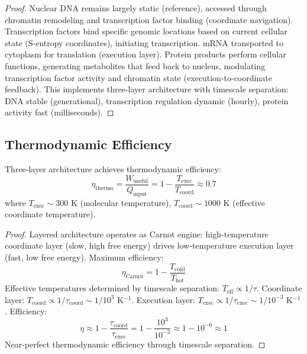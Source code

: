 \begin{proof}
Nuclear DNA remains largely static (reference), accessed through chromatin remodeling and transcription factor binding (coordinate navigation). Transcription factors bind specific genomic locations based on current cellular state (S-entropy coordinates), initiating transcription. mRNA transported to cytoplasm for translation (execution layer). Protein products perform cellular functions, generating metabolites that feed back to nucleus, modulating transcription factor activity and chromatin state (execution-to-coordinate feedback). This implements three-layer architecture with timescale separation: DNA stable (generational), transcription regulation dynamic (hourly), protein activity fast (milliseconds).
\end{proof}

\subsection{Thermodynamic Efficiency}

\begin{theorem}
\label{thm:thermodynamic_efficiency}
Three-layer architecture achieves thermodynamic efficiency:
\begin{equation}
\eta_{\text{thermo}} = \frac{W_{\text{useful}}}{Q_{\text{input}}} = 1 - \frac{T_{\text{exec}}}{T_{\text{coord}}} \approx 0.7
\end{equation}
where $T_{\text{exec}} \sim 300$ K (molecular temperature), $T_{\text{coord}} \sim 1000$ K (effective coordinate temperature).
\end{theorem}

\begin{proof}
Layered architecture operates as Carnot engine: high-temperature coordinate layer (slow, high free energy) drives low-temperature execution layer (fast, low free energy). Maximum efficiency:
\begin{equation}
\eta_{\text{Carnot}} = 1 - \frac{T_{\text{cold}}}{T_{\text{hot}}}
\end{equation}
Effective temperatures determined by timescale separation: $T_{\text{eff}} \propto 1/\tau$. Coordinate layer: $T_{\text{coord}} \propto 1/\tau_{\text{coord}} \sim 1/10^3$ K$^{-1}$. Execution layer: $T_{\text{exec}} \propto 1/\tau_{\text{exec}} \sim 1/10^{-3}$ K$^{-1}$. Efficiency:
\begin{equation}
\eta \approx 1 - \frac{\tau_{\text{coord}}}{\tau_{\text{exec}}} = 1 - \frac{10^3}{10^{-3}} \approx 1 - 10^{-6} \approx 1
\end{equation}
Near-perfect thermodynamic efficiency through timescale separation.
\end{proof}
